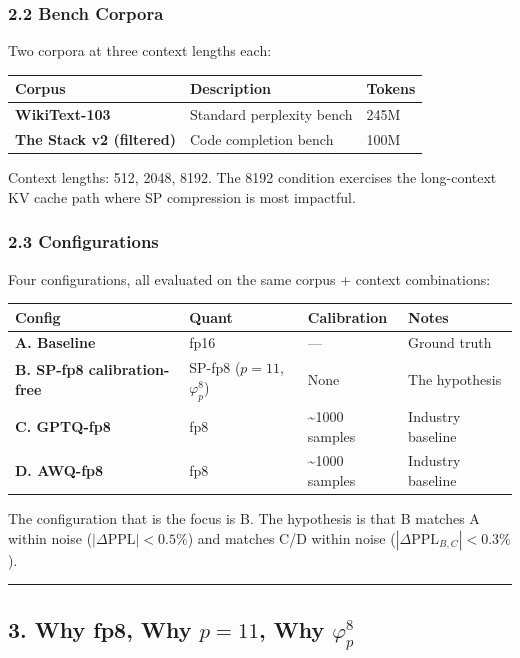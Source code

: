 \documentclass[
  11pt,
]{article}
\begin{document}
\hypertarget{bench-corpora}{%
\subsubsection{2.2 Bench Corpora}\label{bench-corpora}}

Two corpora at three context lengths each:

\begin{longtable}[]{@{}lll@{}}
\toprule
Corpus & Description & Tokens\tabularnewline
\midrule
\endhead
\textbf{WikiText-103} & Standard perplexity bench & 245M\tabularnewline
\textbf{The Stack v2 (filtered)} & Code completion bench &
100M\tabularnewline
\bottomrule
\end{longtable}

Context lengths: 512, 2048, 8192. The 8192 condition exercises the
long-context KV cache path where SP compression is most impactful.

\hypertarget{configurations}{%
\subsubsection{2.3 Configurations}\label{configurations}}

Four configurations, all evaluated on the same corpus + context
combinations:

\begin{longtable}[]{@{}llll@{}}
\toprule
Config & Quant & Calibration & Notes\tabularnewline
\midrule
\endhead
\textbf{A. Baseline} & fp16 & --- & Ground truth\tabularnewline
\textbf{B. SP-fp8 calibration-free} & SP-fp8 (\(p = 11\),
\(\varphi_p^8\)) & None & The hypothesis\tabularnewline
\textbf{C. GPTQ-fp8} & fp8 & \textasciitilde1000 samples & Industry
baseline\tabularnewline
\textbf{D. AWQ-fp8} & fp8 & \textasciitilde1000 samples & Industry
baseline\tabularnewline
\bottomrule
\end{longtable}

The configuration that is the focus is B. The hypothesis is that B
matches A within noise (\(|\Delta\mathrm{PPL}| < 0.5\%\)) and matches
C/D within noise (\(|\Delta\mathrm{PPL}_{B,C}| < 0.3\%\)).

\begin{center}\rule{0.5\linewidth}{0.5pt}\end{center}

\hypertarget{why-fp8-why-p-11-why-varphi_p8}{%
\subsection{\texorpdfstring{3. Why fp8, Why \(p = 11\), Why
\(\varphi_p^8\)}{3. Why fp8, Why p = 11, Why \textbackslash varphi\_p\^{}8}}\label{why-fp8-why-p-11-why-varphi_p8}}
\end{document}
